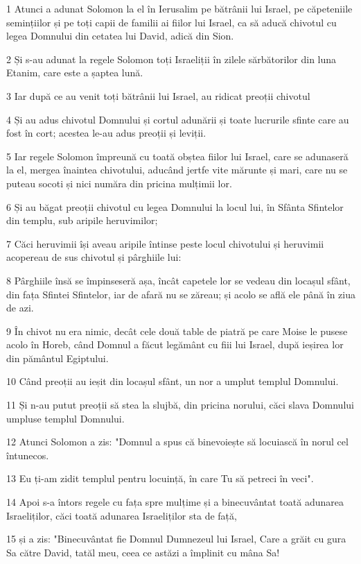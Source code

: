 \par 1 Atunci a adunat Solomon la el în Ierusalim pe bătrânii lui Israel, pe căpeteniile semințiilor și pe toți capii de familii ai fiilor lui Israel, ca să aducă chivotul cu legea Domnului din cetatea lui David, adică din Sion.
\par 2 Și s-au adunat la regele Solomon toți Israeliții în zilele sărbătorilor din luna Etanim, care este a șaptea lună.
\par 3 Iar după ce au venit toți bătrânii lui Israel, au ridicat preoții chivotul
\par 4 Și au adus chivotul Domnului și cortul adunării și toate lucrurile sfinte care au fost în cort; acestea le-au adus preoții și leviții.
\par 5 Iar regele Solomon împreună cu toată obștea fiilor lui Israel, care se adunaseră la el, mergea înaintea chivotului, aducând jertfe vite mărunte și mari, care nu se puteau socoti și nici număra din pricina mulțimii lor.
\par 6 Și au băgat preoții chivotul cu legea Domnului la locul lui, în Sfânta Sfintelor din templu, sub aripile heruvimilor;
\par 7 Căci heruvimii își aveau aripile întinse peste locul chivotului și heruvimii acopereau de sus chivotul și pârghiile lui:
\par 8 Pârghiile însă se împinseseră așa, încât capetele lor se vedeau din locașul sfânt, din fața Sfintei Sfintelor, iar de afară nu se zăreau; și acolo se află ele până în ziua de azi.
\par 9 În chivot nu era nimic, decât cele două table de piatră pe care Moise le pusese acolo în Horeb, când Domnul a făcut legământ cu fiii lui Israel, după ieșirea lor din pământul Egiptului.
\par 10 Când preoții au ieșit din locașul sfânt, un nor a umplut templul Domnului.
\par 11 Și n-au putut preoții să stea la slujbă, din pricina norului, căci slava Domnului umpluse templul Domnului.
\par 12 Atunci Solomon a zis: "Domnul a spus că binevoiește să locuiască în norul cel întunecos.
\par 13 Eu ți-am zidit templul pentru locuință, în care Tu să petreci în veci".
\par 14 Apoi s-a întors regele cu fața spre mulțime și a binecuvântat toată adunarea Israeliților, căci toată adunarea Israeliților sta de față,
\par 15 și a zis: "Binecuvântat fie Domnul Dumnezeul lui Israel, Care a grăit cu gura Sa către David, tatăl meu, ceea ce astăzi a împlinit cu mâna Sa!
